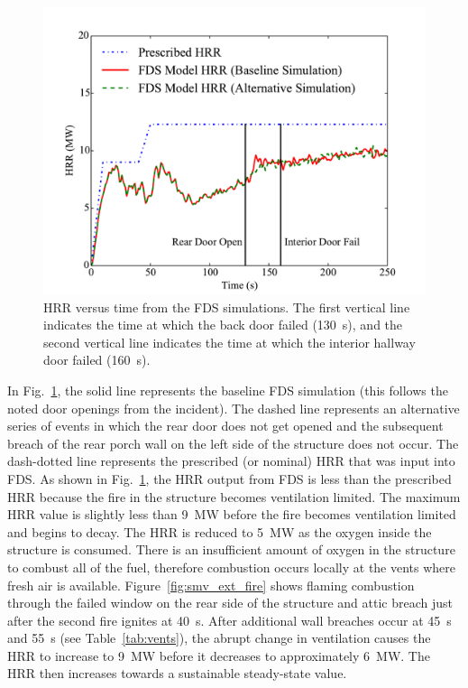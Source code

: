 \documentclass[12pt,oneside]{book}
\begin{document}
\begin{figure}[!ht]
\centering
\includegraphics[width=.80\textwidth]{../Figures/Chicago_Fire_HRR}
\caption[HRR versus time from the FDS simulations.]{HRR versus time from the FDS simulations. The first vertical line indicates the time at which the back door failed (130~s), and the second vertical line indicates the time at which the interior hallway door failed (160~s).}
\label{fig:hrr}
\end{figure}

In Fig.~\ref{fig:hrr}, the solid line represents the baseline FDS simulation (this follows the noted door openings from the incident). The dashed line represents an alternative series of events in which the rear door does not get opened and the subsequent breach of the rear porch wall on the left side of the structure does not occur. The dash-dotted line represents the prescribed (or nominal) HRR that was input into FDS. As shown in Fig.~\ref{fig:hrr}, the HRR output from FDS is less than the prescribed HRR because the fire in the structure becomes ventilation limited. The maximum HRR value is slightly less than 9~MW before the fire becomes ventilation limited and begins to decay. The HRR is reduced to 5~MW as the oxygen inside the structure is consumed. There is an insufficient amount of oxygen in the structure to combust all of the fuel, therefore combustion occurs locally at the vents where fresh air is available. Figure~\ref{fig:smv_ext_fire} shows flaming combustion through the failed window on the rear side of the structure and attic breach just after the second fire ignites at 40~s. After additional wall breaches occur at 45~s and 55~s (see Table~\ref{tab:vents}), the abrupt change in ventilation causes the HRR to increase to 9~MW before it decreases to approximately 6~MW. The HRR then increases towards a sustainable steady-state value.
\end{document}

